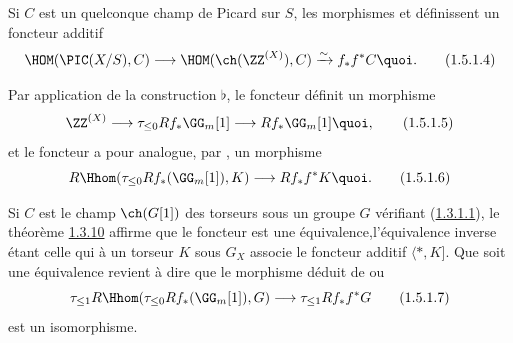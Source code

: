 Si $C$ est un quelconque champ de Picard sur $S$, les morphismes
 et  définissent un foncteur additif
\begin{equation*}
\HOM(\PIC(X/S),C)\longrightarrow\HOM(\ch(\ZZ^{(X)}),
C)\xrightarrow{\sim} f_{\ast}f^{\ast}C{\quoi}.\tag{1.5.1.4}
\end{equation*}

Par application de la construction $\flat$, le foncteur 
définit un morphisme
\begin{equation*}
\ZZ^{(X)}\longrightarrow \tau_{\leq 0}
Rf_{\ast}\GG_{m}[1]\longrightarrow
Rf_{\ast}\GG_{m}[1]{\quoi},\tag{1.5.1.5}
\end{equation*}%
et le foncteur  a pour analogue, par , un morphisme
\begin{equation*}
R\Hhom(\tau_{\leq 0} Rf_{\ast}(\GG_{m}[1]),K)\longrightarrow
Rf_{\ast} f^{\ast}K{\quoi}.\tag{1.5.1.6}
\end{equation*}

Si $C$ est le champ $\ch(G[1])$ des torseurs sous un groupe $G$
vérifiant (\hyperref[XVIII.par1.3.1.1]{1.3.1.1}), le théorème \hyperref[XVIII.thm1.3.10]{1.3.10}
affirme que le foncteur 
 est une équivalence,\pageoriginale l'équivalence inverse étant
celle qui à un torseur $K$ sous $G_{X}$ associe le foncteur additif
$\langle \ast,K]$. Que  soit une équivalence revient à dire que le
morphisme déduit de  ou 
\begin{equation*}
\tau_{\leq 1}R\Hhom(\tau_{\leq
0}Rf_{\ast}(\GG_{m}[1]),G)\longrightarrow \tau_{\leq 1}
Rf_{\ast}f^{\ast}G\tag{1.5.1.7}
\end{equation*}%
est un isomorphisme.

